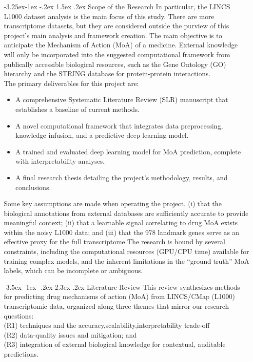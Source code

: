 \documentclass[12pt,a4paper]{article}
\makeatletter
\renewcommand\section{\@startsection{section}{1}{\z@}%
  {-3.5ex \@plus-1ex \@minus-.2ex}%
  {2.3ex \@plus.2ex}%
  {\normalfont\large\bfseries}}
\renewcommand\subsection{\@startsection{subsection}{2}{\z@}%
  {-3.25ex\@plus-1ex \@minus-.2ex}%
  {1.5ex \@plus.2ex}%
  {\normalfont\normalsize\bfseries}}
\makeatother
\begin{document}
\subsection{Scope of the Research}
In particular, the LINCS L1000 dataset analysis is the main focus of this study.  There are more transcriptome datasets, but they are considered outside the purview of this project's main analysis and framework creation.  The main objective is to anticipate the Mechanism of Action (MoA) of a medicine.  External knowledge will only be incorporated into the suggested computational framework from publically accessible biological resources, such as the Gene Ontology (GO) hierarchy and the STRING database for protein-protein interactions.
\\
The primary deliverables for this project are:
\begin{itemize}
  \item A comprehensive Systematic Literature Review (SLR) manuscript that establishes a baseline of current methods.
  \item A novel computational framework that integrates data preprocessing, knowledge infusion, and a predictive deep learning model.
  \item A trained and evaluated deep learning model for MoA prediction, complete with interpretability analyses.
  \item A final research thesis detailing the project's methodology, results, and conclusions.
\end{itemize}
Some key assumptions are made when operating the project.
(i) that the biological annotations from external databases are sufficiently accurate to provide meaningful context; (ii) that a learnable signal correlating to drug MoA exists within the noisy L1000 data; and (iii) that the 978 landmark genes serve as an effective proxy for the full transcriptome
The research is bound by several constraints, including the computational resources (GPU/CPU time) available for training complex models, and the inherent limitations in the \enquote{ground truth} MoA labels, which can be incomplete or ambiguous.

\section{Literature Review}
This review synthesizes methods for predicting drug mechanisms of action (MoA) from LINCS/CMap (L1000) transcriptomic data, organized along three themes that mirror our research questions: \\(R1) techniques and the accuracy,scalability,interpretability trade-off \\ (R2) data-quality issues and mitigation; and \\(R3) integration of external biological knowledge for contextual, auditable predictions.
\end{document}
